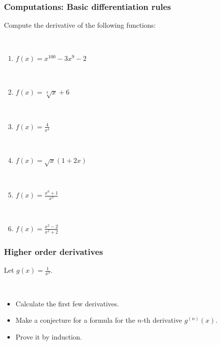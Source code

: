 \documentclass[14pt]{beamer}
\newcommand {\DS} [1] {${\displaystyle #1}$}
\begin{document}
\begin{frame}
\frametitle{Computations: Basic differentiation rules}

Compute the derivative of the following functions:

\
\begin{multicols}{2}
\begin{enumerate}
	\item  \DS{f(x) = x^{100} - 3x^{9} - 2}

\

	\item  \DS{f(x) = \sqrt[3]{x} + 6}

\

	\item  \DS{f(x) = \frac{4}{x^4}}

\

	\item  \DS{f(x) = \sqrt{x} \left( 1 + 2x \right)}

\

	\item  \DS{f(x) = \frac{x^6+ 1}{x^3}}

\

	\item  \DS{f(x) = \frac{x^2-2}{x^2+2}}
\end{enumerate}
\end{multicols}

\end{frame}

\begin{frame}[t]
\frametitle{Higher order derivatives}


Let \DS{g(x) = \frac{1}{x^3}}.

\

\begin{itemize}
	\item Calculate the first few derivatives.  
	\item Make a conjecture for a formula for  the $n$-th derivative \DS{g^{(n)}(x)}.
	\item  Prove it by induction.
\end{itemize}

\end{frame}

\end{document}
